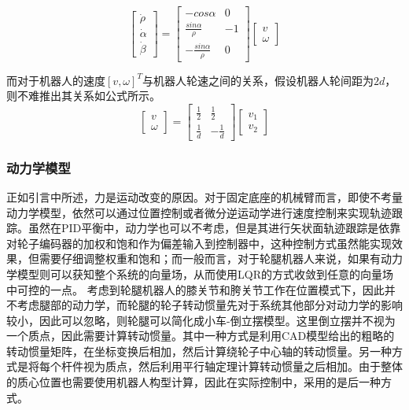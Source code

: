\begin{equation}
    \begin{bmatrix}
        \dot{\rho} \\ \dot{\alpha} \\ \dot{\beta}
    \end{bmatrix} = 
    \begin{bmatrix}
        -cos\alpha & 0 \\ \frac{sin \alpha}{\rho} & -1 \\ -\frac{sin\alpha}{\rho} & 0
    \end{bmatrix}
    \begin{bmatrix}
        v \\ \omega
    \end{bmatrix}
\end{equation}

而对于机器人的速度$[v,\omega]^T$与机器人轮速之间的关系，假设机器人轮间距为$2d$，则不难推出其关系如公式所示。
\begin{equation}
    \begin{bmatrix}
        v \\ \omega
    \end{bmatrix} = 
    \begin{bmatrix}
        \frac{1}{2} & \frac{1}{2} \\ \frac{1}{d} & -\frac{1}{d}
    \end{bmatrix}
    \begin{bmatrix}
        v_1 \\ v_2
    \end{bmatrix}
    \label{eq:naveq}
\end{equation}

\subsubsection{动力学模型}
正如引言中所述，力是运动改变的原因。对于固定底座的机械臂而言，即使不考量动力学模型，依然可以通过位置控制或者微分逆运动学进行速度控制来实现轨迹跟踪。虽然在PID平衡中，动力学也可以不考虑，但是其进行矢状面轨迹跟踪是依靠对轮子编码器的加权和饱和作为偏差输入到控制器中，这种控制方式虽然能实现效果，但需要仔细调整权重和饱和；而一般而言，对于轮腿机器人来说，如果有动力学模型则可以获知整个系统的向量场，从而使用LQR的方式收敛到任意的向量场中可控的一点。
考虑到轮腿机器人的膝关节和胯关节工作在位置模式下，因此并不考虑腿部的动力学，而轮腿的轮子转动惯量先对于系统其他部分对动力学的影响较小，因此可以忽略，则轮腿可以简化成小车-倒立摆模型。这里倒立摆并不视为一个质点，因此需要计算转动惯量。其中一种方式是利用CAD模型给出的粗略的转动惯量矩阵，在坐标变换后相加，然后计算绕轮子中心轴的转动惯量。另一种方式是将每个杆件视为质点，然后利用平行轴定理计算转动惯量之后相加。由于整体的质心位置也需要使用机器人构型计算，因此在实际控制中，采用的是后一种方式。


